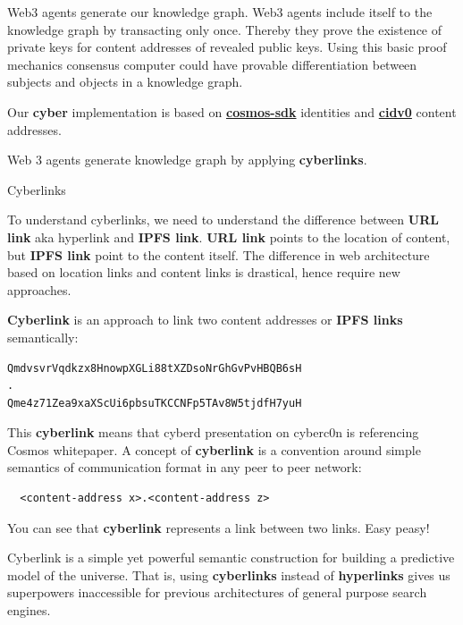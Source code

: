 \documentclass[10pt,oneside]{amsart}
\makeatletter
\def\section{\@startsection{section}{1}%
  \z@{.7\linespacing\@plus\linespacing}{.5\linespacing}%
  {\normalfont\scshape}}%
\newcommand{\code}[1]{\textbf{#1}}
\makeatother
\begin{document}
Web3 agents generate our knowledge graph. Web3 agents include itself to the knowledge
 graph by transacting only once. Thereby they prove the existence of private keys for content addresses of revealed public keys. Using this basic proof mechanics consensus computer could have provable differentiation between subjects and objects in a knowledge graph.

Our \code{cyber} implementation is based on
\href{https://github.com/cosmos/cosmos-sdk}{\code{cosmos-sdk}}
 identities and 
 \href{https://github.com/multiformats/cid#cidv0}{\code{cidv0}}
  content addresses.

Web 3 agents generate knowledge graph by applying \code{cyberlinks}.

\section{Cyberlinks}\label{cyberlinks}

To understand cyberlinks, we need to understand the difference between \code{URL link} aka hyperlink and \code{IPFS link}. \code{URL link} points to the location of content, but \code{IPFS link} point to the content itself. The difference in web architecture based on location links and content links is drastical, hence require new approaches.

\code{Cyberlink} is an approach to link two content addresses or \code{IPFS links} semantically:

\begin{lstlisting}
QmdvsvrVqdkzx8HnowpXGLi88tXZDsoNrGhGvPvHBQB6sH
.
Qme4z71Zea9xaXScUi6pbsuTKCCNFp5TAv8W5tjdfH7yuH
\end{lstlisting}

This \code{cyberlink} means that cyberd presentation on cyberc0n is referencing Cosmos whitepaper. A concept of \code{cyberlink} is a convention around simple semantics of communication format in any peer to peer network:

\begin{lstlisting}
  <content-address x>.<content-address z>
\end{lstlisting}

You can see that \code{cyberlink} represents a link between two links. Easy peasy!

Cyberlink is a simple yet powerful semantic construction for building a predictive model of the universe. That is, using \code{cyberlinks} instead of \code{hyperlinks} gives us superpowers inaccessible for previous architectures of general purpose search engines.
\end{document}

